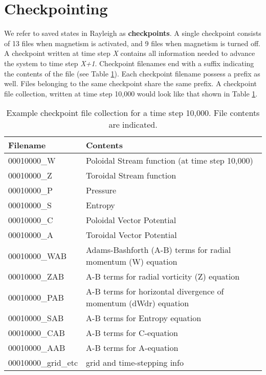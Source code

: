 \clearpage
\section{Checkpointing}\label{sec:checkpointing}

We refer to saved states in Rayleigh as \textbf{checkpoints}.  A single checkpoint consists of  13 files when magnetism is activated, and 9 files when magnetism is turned off.  A checkpoint written at time step \textit{X} contains all information needed to advance the system to time step \textit{X+1}. Checkpoint filenames end with a suffix indicating the contents of the file (see Table \ref{table:checkpoints}).  Each checkpoint filename possess a prefix as well.  Files belonging to the same checkpoint share the same prefix.  A checkpoint file collection, written at time step 10,000 would look like that shown in Table \ref{table:checkpoints}.
\begin{table}
\centering
\begin{tabular} {| l | l |}
\hline
 Filename & Contents \\
\hline
 00010000\_W      & Poloidal Stream function (at time step 10,000)  \\
 00010000\_Z   & Toroidal Stream function\\
 00010000\_P      & Pressure   \\
 00010000\_S      & Entropy   \\
 00010000\_C   & Poloidal Vector Potential  \\
 00010000\_A   & Toroidal Vector Potential \\
 00010000\_WAB      & Adams-Bashforth (A-B) terms for radial momentum (W) equation   \\
 00010000\_ZAB   & A-B terms for radial vorticity (Z) equation\\
 00010000\_PAB      & A-B terms for horizontal divergence of momentum (dWdr) equation   \\
 00010000\_SAB      & A-B terms for Entropy equation   \\
 00010000\_CAB   & A-B terms for C-equation  \\
 00010000\_AAB   & A-B terms for A-equation \\
 00010000\_grid\_etc & grid and time-stepping info \\
\hline
\end{tabular}
\caption{\label{table:checkpoints} Example checkpoint file collection for a time step 10,000.  File contents are indicated.}
\end{table}

